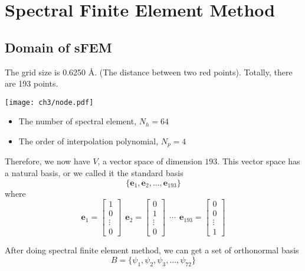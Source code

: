 \chapter{Spectral Finite Element Method}
\section{Domain of sFEM}
The grid size is 0.6250 Å. (The distance between two red points). Totally, there are 193 points.
\begin{center}
        \texttt{[image: ch3/node.pdf]}
\end{center}
\begin{itemize}
        \item The number of spectral element, $N_h=64$
        \item The order of interpolation polynomial, $N_p=4$
\end{itemize}
Therefore, we now have $V$, a vector space  of dimension $193$. This vector space has a natural basis, or we called it the standard basis
\begin{equation}
        \{\textbf{e}_1, \textbf{e}_2, ..., \textbf{e}_{193}\}
\end{equation}
where
\begin{equation}
\textbf{e}_1=  \begin{bmatrix} 1 \\ 0 \\ \vdots \\ 0 \end{bmatrix}~~
\textbf{e}_2=  \begin{bmatrix} 0 \\ 1 \\ \vdots \\ 0 \end{bmatrix}~~
\cdots ~~
\textbf{e}_{193} = \begin{bmatrix} 0 \\ 0 \\ \vdots \\ 1 \end{bmatrix} 
\end{equation}

\begin{definition}
After doing spectral finite element method, we can get a set of orthonormal basis
\begin{equation}
        B = \{ \psi_1, \psi_2, \psi_3, ..., \psi_{72} \}    
\end{equation}
\end{definition}

